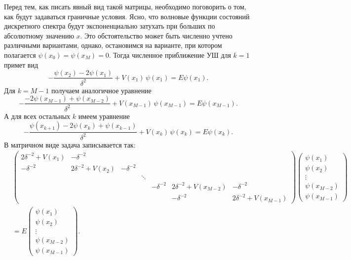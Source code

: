 \documentclass[10pt]{article}
\begin{document}
Перед тем, как писать явный вид такой матрицы, необходимо поговорить о том, как будут задаваться граничные условия. Ясно, что волновые функции состояний дискретного спектра будут экспоненциально затухать при больших по абсолютному значению $x$. Это обстоятельство может быть численно учтено различными вариантами, однако, остановимся на варианте, при котором полагается $\psi(x_0) = \psi(x_M) = 0$. Тогда численное приближение УШ для $k=1$ примет вид
\begin{equation}
    -\dfrac{\psi(x_{2}) - 2\psi(x_{1})}{\delta^2} + V(x_1)\,\psi(x_1) = E\psi(x_1).
\end{equation}
Для $k=M-1$ получаем аналогичное уравнение
\begin{equation}
    -\dfrac{-2\psi(x_{M-1})+\psi(x_{M-2}) }{\delta^2} + V(x_{M-1})\,\psi(x_{M-1}) = E\psi(x_{M-1}).
\end{equation}
А для всех остальных $k$ имеем уравнение
\begin{equation}
    -\dfrac{\psi(x_{k+1}) - 2\psi(x_{k}) + \psi(x_{k-1})}{\delta^2} + V(x_k)\,\psi(x_k) = E\psi(x_k).
\end{equation}
В матричном виде задача записывается так:
\begin{equation}
\begin{split}
    &\begin{pmatrix}
        2\delta^{-2}+V(x_1)& -\delta^{-2}\\
        -\delta^{-2}& 2\delta^{-2}+V(x_2)& -\delta^{-2}\\
        & & & \ddots&\\
        & & & & -\delta^{-2}& 2\delta^{-2}+V(x_{M-2})& -\delta^{-2}\\
        & & & & & -\delta^{-2}& 2\delta^{-2}+V(x_{M-1})
    \end{pmatrix}
    \begin{pmatrix}
        \psi(x_1)\\
        \psi(x_2)\\
        \vdots\\
        \psi(x_{M-2})\\
        \psi(x_{M-1})
    \end{pmatrix}\\
    &=E
    \begin{pmatrix}
        \psi(x_1)\\
        \psi(x_2)\\
        \vdots\\
        \psi(x_{M-2})\\
        \psi(x_{M-1})
    \end{pmatrix}.
\end{split}
\end{equation}
\end{document}
